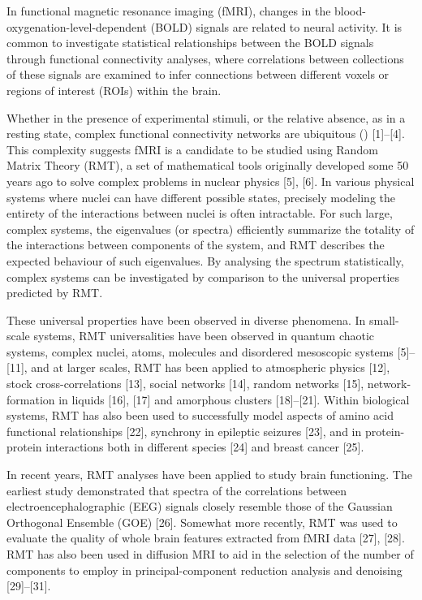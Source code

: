 In functional magnetic resonance imaging (fMRI), changes in the blood-oxygenation-level-dependent
(BOLD) signals are related to neural activity. It is common to investigate statistical relationships
between the BOLD signals through functional connectivity analyses, where correlations between
collections of these signals are examined to infer connections between different voxels or regions
of interest (ROIs) within the brain.

Whether in the presence of experimental stimuli, or the relative absence, as in a resting state,
complex functional connectivity networks are ubiquitous
(\cite{bucknerBrainDefaultNetwork2008,foxCoverHumanBrain2005,gonzalez-castilloTaskbasedDynamicFunctional2018,hermundstadStructuralFoundationsRestingstate2013})
[1]–[4]. This complexity suggests fMRI is a candidate to be studied using Random Matrix Theory
(RMT), a set of mathematical tools originally developed some 50 years ago to solve complex problems
in nuclear physics [5], [6]. In various physical systems where nuclei can have different possible
states, precisely modeling the entirety of the interactions between nuclei is often intractable. For
such large, complex systems, the eigenvalues (or spectra) efficiently summarize the totality of the
interactions between components of the system, and RMT describes the expected behaviour of such
eigenvalues. By analysing the spectrum statistically, complex systems can be investigated by
comparison to the universal properties predicted by RMT.

\begin{sloppypar}
These universal properties have been observed in diverse phenomena. In small-scale systems, RMT
universalities have been observed in quantum chaotic systems, complex nuclei, atoms, molecules and
disordered mesoscopic systems [5]–[11], and at larger scales, RMT has been applied to atmospheric
physics [12], stock cross-correlations [13], social networks [14], random networks [15],
network-formation in liquids [16], [17] and amorphous clusters [18]–[21]. Within biological systems,
RMT has also been used to successfully model aspects of  amino acid functional relationships [22],
synchrony in epileptic seizures [23], and in protein-protein interactions both in different species
[24] and breast cancer [25].
\end{sloppypar}

In recent years, RMT analyses have been applied to study brain functioning.  The earliest  study
demonstrated that spectra of the correlations between electroencephalographic (EEG) signals closely
resemble those of the Gaussian Orthogonal Ensemble (GOE) [26].  Somewhat more recently, RMT was used
to evaluate the quality of whole brain features extracted from fMRI data [27], [28]. RMT has also
been used in diffusion MRI to aid in the selection of the number of components to employ in
principal-component reduction analysis and denoising [29]–[31].

